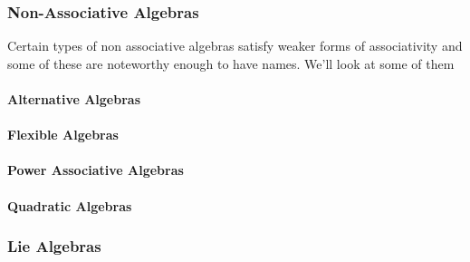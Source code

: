 \subsubsection{Non-Associative Algebras}
Certain types of non associative algebras satisfy weaker forms of associativity and some of these are noteworthy enough to have names. We'll look at some of them


\paragraph{Alternative Algebras} 

\paragraph{Flexible Algebras} 

\paragraph{Power Associative Algebras}




\paragraph{Quadratic Algebras}


\subsubsection{Lie Algebras} 

